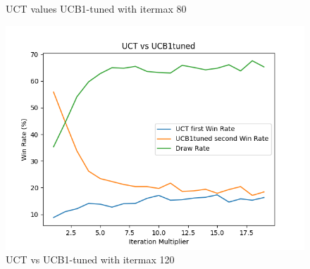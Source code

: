 \documentclass[11pt]{article}
\theoremstyle{definitionstyle}
\begin{document}
\begin{figure}[H]
\begin{minipage}{0.32\textwidth}
        \caption{UCT values UCB1-tuned with itermax 80}
        \label{fig:801}
    \end{minipage}
    \hfill
    \begin{minipage}{0.32\textwidth}
        \includegraphics[width=\textwidth]{mcts/figs/120/UCT vs UCB1tuned2.png}
        \caption{UCT vs UCB1-tuned with itermax 120}
        \label{fig:1201}
    \end{minipage}
\end{figure}
\end{document}
